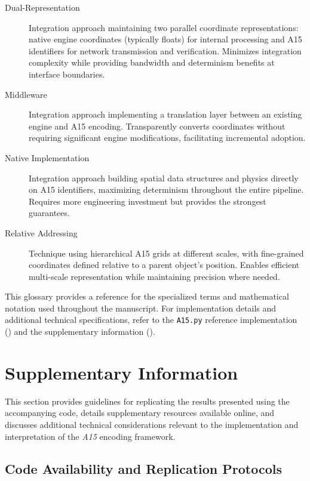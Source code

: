 \documentclass[10pt]{article}
\def\AAAB{\textit{A15}}
\begin{document}
\begin{description}
    \item[Dual-Representation] Integration approach maintaining two parallel coordinate representations: native engine coordinates (typically floats) for internal processing and A15 identifiers for network transmission and verification. Minimizes integration complexity while providing bandwidth and determinism benefits at interface boundaries.

    \item[Middleware] Integration approach implementing a translation layer between an existing engine and A15 encoding. Transparently converts coordinates without requiring significant engine modifications, facilitating incremental adoption.

    \item[Native Implementation] Integration approach building spatial data structures and physics directly on A15 identifiers, maximizing determinism throughout the entire pipeline. Requires more engineering investment but provides the strongest guarantees.

    \item[Relative Addressing] Technique using hierarchical A15 grids at different scales, with fine-grained coordinates defined relative to a parent object's position. Enables efficient multi-scale representation while maintaining precision where needed.
\end{description}

This glossary provides a reference for the specialized terms and mathematical notation used throughout the manuscript. For implementation details and additional technical specifications, refer to the \texttt{A15.py} reference implementation () and the supplementary information ().

\section{Supplementary Information}\label{sec-supplementary}

This section provides guidelines for replicating the results presented using the accompanying code, details supplementary resources available online, and discusses additional technical considerations relevant to the implementation and interpretation of the \AAAB{} encoding framework.

\subsection{Code Availability and Replication Protocols}\label{subsec-replication}
\end{document}
